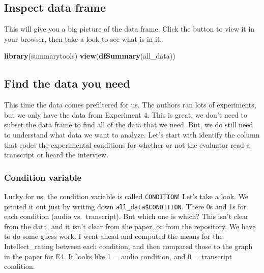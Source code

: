 \documentclass[]{book}
\newenvironment{Shaded}{\begin{snugshade}}{\end{snugshade}}
\newcommand{\KeywordTok}[1]{\textcolor[rgb]{0.13,0.29,0.53}{\textbf{{#1}}}}
\newcommand{\NormalTok}[1]{{#1}}
\theoremstyle{definition}
\theoremstyle{definition}
\theoremstyle{definition}
\theoremstyle{remark}
\begin{document}
\subsection{Inspect data frame}\label{inspect-data-frame}

This will give you a big picture of the data frame. Click the button to
view it in your browser, then take a look to see what is in it.

\begin{Shaded}
\begin{Highlighting}[]
\KeywordTok{library}\NormalTok{(summarytools)}
\KeywordTok{view}\NormalTok{(}\KeywordTok{dfSummary}\NormalTok{(all_data))}
\end{Highlighting}
\end{Shaded}

\subsection{Find the data you need}\label{find-the-data-you-need}

This time the data comes prefiltered for us. The authors ran lots of
experiments, but we only have the data from Experiment 4. This is great,
we don't need to subset the data frame to find all of the data that we
need. But, we do still need to understand what data we want to analyze.
Let's start with identify the column that codes the experimental
conditions for whether or not the evaluator read a transcript or heard
the interview.

\subsubsection{Condition variable}\label{condition-variable}

Lucky for us, the condition variable is called \texttt{CONDITION}! Let's
take a look. We printed it out just by writing down
\texttt{all\_data\$CONDITION}. There 0s and 1s for each condition (audio
vs.~transcript). But which one is which? This isn't clear from the data,
and it isn't clear from the paper, or from the repository. We have to do
some guess work. I went ahead and computed the means for the
Intellect\_rating between each condition, and then compared those to the
graph in the paper for E4. It looks like 1 = audio condition, and 0 =
transcript condition.

\begin{Shaded}
\end{Shaded}
\end{document}
